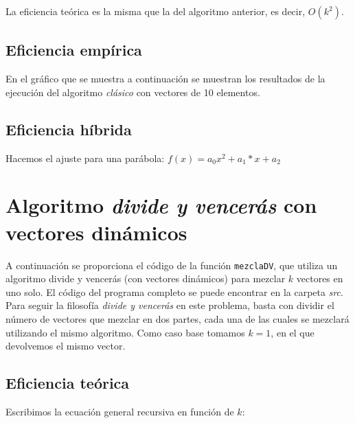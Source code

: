 \documentclass[11pt]{article}
\begin{document}
 La eficiencia teórica es la misma que la del algoritmo anterior, es decir, $O(k^2)$.
 
 \subsection*{Eficiencia empírica}
 
 En el gráfico que se muestra a continuación se muestran los resultados de la
 ejecución del algoritmo \textit{clásico} con vectores de 10 elementos.
 
 \begin{center}
 	
 \end{center}
 
 \subsection*{Eficiencia híbrida}
 
 Hacemos el ajuste para una parábola: $f(x) = a_{0}x^{2}+a_{1}*x + a_{2}$
 \begin{center}
 	
 \end{center}

\section*{Algoritmo \textit{divide y vencerás} con vectores dinámicos}

A continuación se proporciona el código de la función \texttt{mezclaDV},
que utiliza un algoritmo divide y vencerás (con vectores dinámicos) para mezclar $k$ vectores en uno solo. El
código del programa completo se puede encontrar en la carpeta \textit{src}.\\
Para seguir la filosofía \textit{divide y vencerás} en este problema, basta con dividir el número de vectores que mezclar en dos partes, cada una de las cuales se mezclará utilizando el mismo algoritmo. Como caso base tomamos $k=1$, en el que devolvemos el mismo vector.\\



\subsection*{Eficiencia teórica}

Escribimos la ecuación general recursiva en función de $k$:
\end{document}
